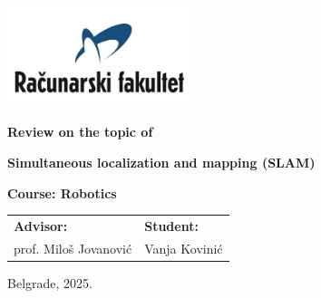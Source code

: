 \documentclass[12pt]{article}
\begin{document}
\begin{titlepage}
    \begin{center}
        
        \vspace*{-1in}
        \includegraphics[width=0.4\textwidth]{raf_logo.png}

        \vspace{1in}
        \Large
        \textbf{Review on the topic of}
        
        \vspace{1in}
        \Huge
        \textbf{Simultaneous localization and mapping (SLAM)}
        
        \vspace{1in}


            \fontsize{17pt}{17pt}\selectfont
            \textbf{Course: Robotics} \\
            \vspace*{1.5in}
            
            \begin{center}
            \normalsize
            \begin{tabular}{p{} p{}}
                \fontsize{14pt}{18pt}\selectfont   
                \textbf{Advisor:} & 
            
                \fontsize{14pt}{18pt}\selectfont
                \textbf{Student:} \\
                prof. Miloš Jovanović & Vanja Kovinić \\
            \end{tabular}
            \end{center}

            \vspace*{\fill}

            \normalsize
            Belgrade, 2025.


            
        \end{center}
    \end{titlepage}
    \restoregeometry %
\end{document}
